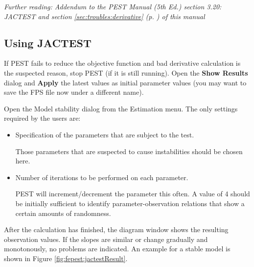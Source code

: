 \textit{Further reading: Addendum to the PEST Manual (5th Ed.)
section 3.20: JACTEST and section \ref{sec:troubles:derivative} (p. \pageref{sec:troubles:derivative}) of this manual}


\subsection{Using JACTEST}

If PEST fails to reduce the objective function and bad derivative calculation is the suspected reason, stop PEST (if it is still running). Open the \textbf{Show Results} dialog and \textbf{Apply} the latest values as initial parameter values (you may want to save the FPS file now under a different name).

Open the Model stability dialog from the Estimation menu. The only settings required by the users are: 

\begin{itemize}
\item Specification of the parameters that are subject to the test. 

Those parameters that are suspected to cause instabilities should be chosen here.

\item Number of iterations to be performed on each parameter. 

PEST will increment/decrement the parameter this often. A value of 4 should be initially sufficient to identify parameter-observation relations that show a certain amounts of randomness.
\end{itemize}

After the calculation has finished, the diagram window shows the resulting observation values. If the slopes are similar or change gradually and monotonously, no problems are indicated. An example for a stable model is shown in Figure \ref{fig:fepest:jactestResult}.

